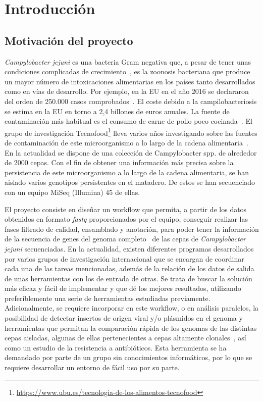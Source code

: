 \chapter{Introducción} 
\label{chap:intro}

\vspace{-0.2cm}

\section{Motivación del proyecto}

\textit{Campylobacter jejuni} es una bacteria Gram negativa que, a pesar de tener unas condiciones complicadas de crecimiento~\cite{garciasanchez2017}, es la zoonosis bacteriana que produce un mayor número de intoxicaciones alimentarias en los países tanto desarrollados como en vías de desarrollo. Por ejemplo, en la EU en el año 2016 se declararon del orden de 250.000 casos comprobados~\cite{report2016}. El coste debido a la campilobacteriosis se estima en la EU en torno a 2,4 billones de euros anuales. La fuente de contaminación más habitual es el consumo de carne de pollo poco cocinada~\cite{GarciaSanchez2018}. El grupo de investigación Tecnofood\footnote{\url{https://www.ubu.es/tecnologia-de-los-alimentos-tecnofood}} lleva varios años investigando sobre las fuentes de contaminación de este microorganismo a lo largo de la cadena alimentaria~\cite{garciasanchez2017, GarciaSanchez2018, Melero2012}. En la actualidad se dispone de una colección de Campylobacter spp. de alrededor de 2000 cepas. Con el fin de obtener una información más precisa sobre la persistencia de este microorganismo a lo largo de la cadena alimentaria, se han aislado varios genotipos persistentes en el matadero. De estos se han secuenciado con un equipo MiSeq (Illumina) 45 de ellas.

El proyecto consiste en diseñar un workflow que permita, a partir de los datos obtenidos en formato \textit{fastq} proporcionados por el equipo, conseguir realizar las fases filtrado de calidad, ensamblado y anotación, para poder tener la información de la secuencia de genes del genoma completo~\cite{Clark2016, Llarena2017, Zhao2016} de las cepas de \textit{Campylobacter jejuni} secuenciadas. En la actualidad, existen diferentes programas desarrollados por varios grupos de investigación internacional que se encargan de coordinar cada una de las tareas mencionadas, además de la relación de los datos de salida de unas herramientas con los de entrada de otras. Se trata de buscar la solución más eficaz y fácil de implementar y que dé los mejores resultados, utilizando preferiblemente una serie de herramientas estudiadas previamente. Adicionalmente, se requiere incorporar en este workflow, o en análisis paralelos, la posibilidad de detectar insertos de origen viral y/o plásmidos en el genoma y herramientas que permitan la comparación rápida de los genomas de las distintas cepas aisladas, algunas de ellas pertenecientes a cepas altamente clonales~\cite{Skarp2015}, así como un estudio de la resistencia a antibióticos. Esta herramienta se ha demandado por parte de un grupo sin conocimientos informáticos, por lo que se requiere desarrollar un entorno de fácil uso por su parte.

